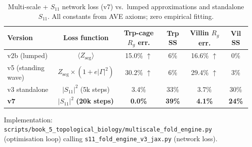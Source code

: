 \begin{table}[H]
\centering
\caption{Multi-scale + $S_{11}$ network loss (v7) vs.\ lumped approximations and standalone $S_{11}$.  All constants from AVE axioms; zero empirical fitting.}
\label{tab:v7_results}
\small
\begin{tabular}{@{}l c c c c c@{}}
\toprule
\textbf{Version} & \textbf{Loss function} & \textbf{Trp-cage $R_g$ err.}  & \textbf{Trp SS} & \textbf{Villin $R_g$ err.} & \textbf{Vil SS} \\
\midrule
v2b (lumped)     & $\langle Z_\text{seg} \rangle$        & 15.0\% $\uparrow$ & 6\%  & 16.6\% $\uparrow$ & 0\% \\
v5 (standing wave) & $Z_\text{seg} \times (1 + e|\Gamma|^2)$ & 30.2\% $\uparrow$ & 6\% & 29.4\% $\uparrow$ & 3\% \\
v3 standalone    & $|S_{11}|^2$ (5k steps)               & 3.4\%             & 33\% & 3.7\%              & 30\% \\
\textbf{v7}      & $|S_{11}|^2$ \textbf{(20k steps)}     & \textbf{0.0\%}    & \textbf{39\%} & \textbf{4.1\%} & \textbf{24\%} \\
\bottomrule
\end{tabular}
\end{table}

Implementation: \texttt{scripts/book\_5\_topological\_biology/multiscale\_fold\_engine.py} (optimisation loop) calling \texttt{s11\_fold\_engine\_v3\_jax.py} (network loss).

